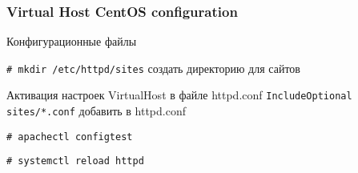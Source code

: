 \begin{frame}[fragile]
    \frametitle{Virtual Host CentOS configuration}
Конфигурационные файлы

\verb|# mkdir /etc/httpd/sites| создать директорию для сайтов

Активация настроек VirtualHost в файле httpd.conf
\verb|IncludeOptional sites/*.conf| добавить в httpd.conf

\verb|# apachectl configtest|

\verb|# systemctl reload httpd|

\end{frame}
